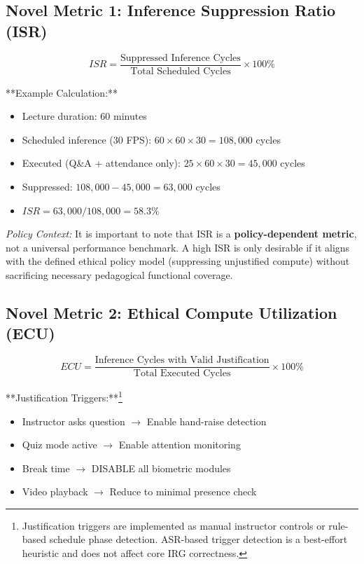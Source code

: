 \documentclass[conference]{IEEEtran}
\begin{document}
\subsection{Novel Metric 1: Inference Suppression Ratio (ISR)}
\begin{equation}
ISR = \frac{\text{Suppressed Inference Cycles}}{\text{Total Scheduled Cycles}} \times 100\%
\end{equation}

**Example Calculation:**
\begin{itemize}
    \item Lecture duration: 60 minutes
    \item Scheduled inference (30 FPS): $60 \times 60 \times 30 = 108,000$ cycles
    \item Executed (Q\&A + attendance only): $25 \times 60 \times 30 = 45,000$ cycles
    \item Suppressed: $108,000 - 45,000 = 63,000$ cycles
    \item $ISR = 63,000 / 108,000 = 58.3\%$
\end{itemize}

\textit{Policy Context:} It is important to note that ISR is a \textbf{policy-dependent metric}, not a universal performance benchmark. A high ISR is only desirable if it aligns with the defined ethical policy model (suppressing unjustified compute) without sacrificing necessary pedagogical functional coverage.

\subsection{Novel Metric 2: Ethical Compute Utilization (ECU)}
\begin{equation}
ECU = \frac{\text{Inference Cycles with Valid Justification}}{\text{Total Executed Cycles}} \times 100\%
\end{equation}

**Justification Triggers:**\footnote{Justification triggers are implemented as manual instructor controls or rule-based schedule phase detection. ASR-based trigger detection is a best-effort heuristic and does not affect core IRG correctness.}
\begin{itemize}
    \item Instructor asks question $\to$ Enable hand-raise detection
    \item Quiz mode active $\to$ Enable attention monitoring
    \item Break time $\to$ DISABLE all biometric modules
    \item Video playback $\to$ Reduce to minimal presence check
\end{itemize}
\end{document}
